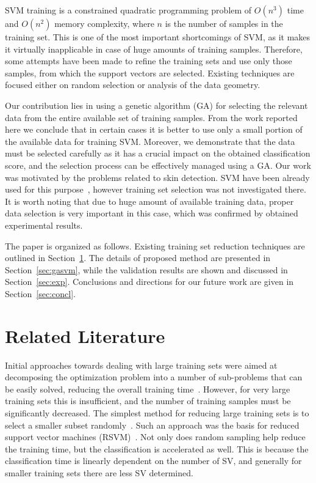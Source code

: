 \documentclass{llncs}
\begin{document}
SVM training is a constrained quadratic programming problem of
$O(n^3)$ time and $O(n^2)$ memory complexity, where $n$ is the
number of samples in the training set. This is one of the most
important shortcomings of SVM, as it makes it virtually inapplicable
in case of huge amounts of training samples. Therefore, some
attempts have been made to refine the training sets and use only
those samples, from which the support vectors are selected. Existing
techniques are focused either on random selection or analysis of the
data geometry.

Our contribution lies in using a genetic algorithm (GA) for selecting
the relevant data from the entire available set of training samples.
From the work reported here we conclude that in certain cases it is
better to use only a small portion of the available data for
training SVM. Moreover, we demonstrate that the data must be
selected carefully as it has a crucial impact on the obtained
classification score, and the selection process can be effectively
managed using a GA. Our work was motivated by the problems related to
skin detection. SVM have been already used for this
purpose~\cite{Khan2012}, however training set selection was not
investigated there. It is worth noting that due to huge amount of
available training data, proper data selection is very important in
this case, which was confirmed by obtained experimental results.

The paper is organized as follows. Existing training set reduction techniques are outlined in Section~\ref{sec:review}. The details of proposed method are presented in
Section~\ref{sec:gasvm}, while the validation results are shown and
discussed in Section~\ref{sec:exp}. Conclusions and directions for
our future work are given in Section~\ref{sec:concl}.

\section{Related Literature} \label{sec:review}

Initial approaches towards dealing with large training sets were
aimed at decomposing the optimization problem into a number of
sub-problems that can be easily solved, reducing the overall
training time~\cite{Joachims1999}. However, for very large training
sets this is insufficient, and the number of training samples must
be significantly decreased. The simplest method for reducing large
training sets is to select a smaller subset randomly~\cite{Balcazar2001}. Such an approach was the basis for
reduced support vector machines (RSVM)~\cite{YJLee2007}. Not only does random
sampling help reduce the training time, but the
classification is accelerated as well. This is because the
classification time is linearly dependent on the number of SV, and generally
for smaller training sets there are less SV determined.
\end{document}
